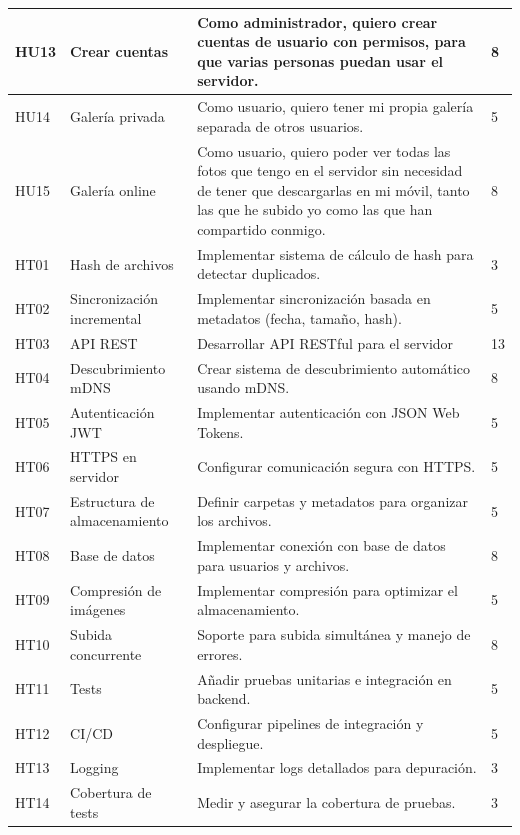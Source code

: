 \begin{tabularx}{\textwidth}{|l|l|>{\raggedright\arraybackslash}X|l|}
    \hline
    HU13 & Crear cuentas & Como administrador, quiero crear cuentas de usuario con permisos, para que varias personas puedan usar el servidor. & 8 \\
    \hline
    HU14 & Galería privada & Como usuario, quiero tener mi propia galería separada de otros usuarios. & 5 \\
    \hline
    HU15 & Galería online & Como usuario, quiero poder ver todas las fotos que tengo en el servidor sin necesidad de tener que descargarlas en mi móvil, tanto las que he subido yo como las que han compartido conmigo. & 8 \\
    \hline
    HT01 & Hash de archivos & Implementar sistema de cálculo de hash para detectar duplicados. & 3 \\
    \hline
    HT02 & Sincronización incremental & Implementar sincronización basada en metadatos (fecha, tamaño, hash). & 5 \\
    \hline
    HT03 & API REST & Desarrollar API RESTful para el servidor & 13 \\
    \hline
    HT04 & Descubrimiento mDNS & Crear sistema de descubrimiento automático usando mDNS. & 8 \\
    \hline
    HT05 & Autenticación JWT & Implementar autenticación con JSON Web Tokens. & 5 \\
    \hline
    HT06 & HTTPS en servidor & Configurar comunicación segura con HTTPS. & 5 \\
    \hline
    HT07 & Estructura de almacenamiento & Definir carpetas y metadatos para organizar los archivos. & 5 \\
    \hline
    HT08 & Base de datos & Implementar conexión con base de datos para usuarios y archivos. & 8 \\
    \hline
    HT09 & Compresión de imágenes & Implementar compresión para optimizar el almacenamiento. & 5 \\
    \hline
    HT10 & Subida concurrente & Soporte para subida simultánea y manejo de errores. & 8 \\
    \hline
    HT11 & Tests & Añadir pruebas unitarias e integración en backend. & 5 \\
    \hline
    HT12 & CI/CD & Configurar pipelines de integración y despliegue. & 5 \\
    \hline
    HT13 & Logging & Implementar logs detallados para depuración. & 3 \\
    \hline
    HT14 & Cobertura de tests & Medir y asegurar la cobertura de pruebas. & 3 \\

\end{tabularx}
